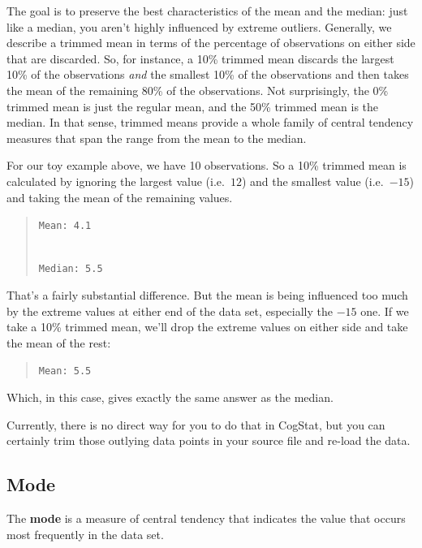\documentclass[
  11pt,
  a4paper,
  twoside,symmetric,openright]{book}
\theoremstyle{break}
\theoremstyle{break}
\begin{document}
The goal is to preserve the best characteristics of the mean and the median: just like a median, you aren't highly influenced by extreme outliers. Generally, we describe a trimmed mean in terms of the percentage of observations on either side that are discarded. So, for instance, a 10\% trimmed mean discards the largest 10\% of the observations \emph{and} the smallest 10\% of the observations and then takes the mean of the remaining 80\% of the observations. Not surprisingly, the 0\% trimmed mean is just the regular mean, and the 50\% trimmed mean is the median. In that sense, trimmed means provide a whole family of central tendency measures that span the range from the mean to the median.

\begin{example}
\protect\hypertarget{exm:extrimmedmean}{}\label{exm:extrimmedmean}For our toy example above, we have 10 observations. So a 10\% trimmed mean is calculated by ignoring the largest value (i.e.~\(12\)) and the smallest value (i.e.~\(-15\)) and taking the mean of the remaining values.

\begin{quote}
\texttt{Mean:\ 4.1}\strut \\
\texttt{Median:\ 5.5}
\end{quote}

That's a fairly substantial difference. But the mean is being influenced too much by the extreme values at either end of the data set, especially the \(-15\) one. If we take a 10\% trimmed mean, we'll drop the extreme values on either side and take the mean of the rest:

\begin{quote}
\texttt{Mean:\ 5.5}
\end{quote}

Which, in this case, gives exactly the same answer as the median.
\end{example}

Currently, there is no direct way for you to do that in CogStat, but you can certainly trim those outlying data points in your source file and re-load the data.

\hypertarget{mode}{%
\subsection{Mode}\label{mode}}

\begin{definition}[Mode]
\protect\hypertarget{def:defmode}{}\label{def:defmode}The \textbf{mode} is a measure of central tendency that indicates the value that occurs most frequently in the data set.
\end{definition}
\end{document}
